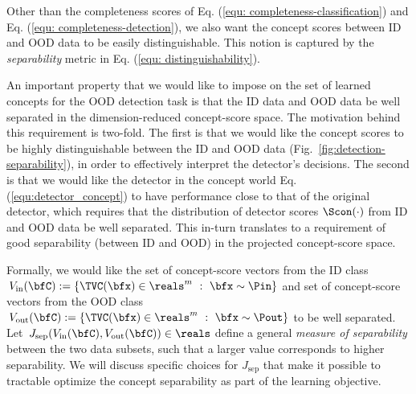 
 Other than the completeness scores of Eq. (\ref{equ: completeness-classification}) and Eq. (\ref{equ: completeness-detection}), we also want the concept scores between ID and OOD data to be easily distinguishable. This notion is captured by the \textit{separability} metric in Eq. (\ref{equ: distinguishability}). 

\fi
An important property that we would like to impose on the set of learned concepts for the OOD detection task is that the ID data and OOD data be well separated in the dimension-reduced concept-score space.
The motivation behind this requirement is two-fold.
The first is that we would like the concept scores to be highly distinguishable between the ID and OOD data (\eg Fig.~\ref{fig:detection-separability}), in order to effectively interpret the detector's decisions.
The second is that we would like the detector in the concept world Eq. (\ref{equ:detector_concept}) to have performance close to that of the original detector, which requires that the distribution of detector scores $\Scon(\cdot)$ from ID and OOD data be well separated.
This in-turn translates to a requirement of good separability (between ID and OOD) in the projected concept-score space.

Formally, we would like the set of concept-score vectors from the ID class $\,V_{\textrm{in}}(\bfC) := \{\TVC(\bfx) \in \reals^m ~:~ \bfx \sim \Pin\}$ and set of concept-score vectors from the OOD class $\,V_{\textrm{out}}(\bfC) := \{\TVC(\bfx) \in \reals^m ~:~ \bfx \sim \Pout\}$ to be well separated.
Let $\,J_{\textrm{sep}}(V_{\textrm{in}}(\bfC), V_{\textrm{out}}(\bfC)) \in \reals$ define a general {\it measure of separability} between the two data subsets, such that a larger value corresponds to higher separability.
We will discuss specific choices for $J_{\textrm{sep}}$ that make it possible to tractable optimize the concept separability as part of the learning objective.

